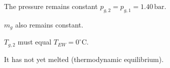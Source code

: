 The pressure remains constant \( p_{g,2} = p_{g,1} = 1.40 \, \text{bar} \).  

\( m_g \) also remains constant.  

\( T_{g,2} \) must equal \( T_{EW} = 0^\circ \text{C} \).  

It has not yet melted (thermodynamic equilibrium).